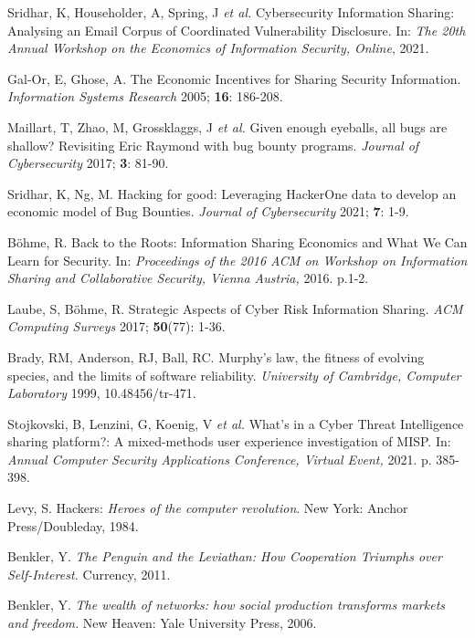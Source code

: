 \documentclass[unnumsec,webpdf,contemporary,large]{oup-authoring-template}%
\theoremstyle{thmstyleone}%
\theoremstyle{thmstyletwo}%
\theoremstyle{thmstylethree}%
\begin{document}
\begin{thebibliography}{10}

Sridhar, K, Householder, A, Spring, J {\em et al.}
  Cybersecurity Information Sharing: Analysing
an Email Corpus of Coordinated Vulnerability
Disclosure. In: {\em The 20th Annual Workshop on
the Economics of Information Security, Online}, 2021.

Gal-Or, E,  Ghose, A. The Economic Incentives for Sharing Security Information. 
{\em Information Systems Research} 2005; {\bf 16}: 186-208.

Maillart, T,  Zhao, M, Grossklaggs, J {\em et al.} Given enough eyeballs, all bugs are
shallow? Revisiting Eric Raymond with bug bounty programs. {\em Journal of Cybersecurity} 2017; {\bf 3}: 81-90.

Sridhar, K, Ng, M. Hacking for good: Leveraging HackerOne
data to develop an economic model of Bug Bounties. {\em Journal of Cybersecurity} 2021; {\bf 7}: 1-9.

B\"{o}hme, R. Back to the Roots: Information Sharing Economics and What We Can Learn for Security. In: {\em Proceedings of the 2016 ACM on Workshop on Information
Sharing and Collaborative Security, Vienna Austria,} 2016. p.1-2.

Laube, S, B\"{o}hme, R. Strategic Aspects of Cyber Risk Information Sharing. {\em ACM Computing Surveys} 2017; {\bf 50}(77): 1-36.

Brady, RM, Anderson, RJ, Ball, RC. Murphy’s law, the fitness of evolving species, and the limits of software reliability. {\em University of Cambridge, Computer Laboratory} 1999, 10.48456/tr-471.

Stojkovski, B, Lenzini, G, Koenig, V {\em et al.} What’s in a Cyber Threat Intelligence
sharing platform?: A mixed-methods user experience investigation of MISP. In: {\em Annual Computer Security Applications Conference, Virtual Event,} 2021. p. 385-398.

Levy, S. Hackers: {\em Heroes of the computer revolution}. New York: Anchor Press/Doubleday, 1984.

Benkler, Y. {\em The Penguin and the Leviathan: How Cooperation Triumphs over Self-Interest.} Currency, 2011.

Benkler, Y. {\em The wealth of networks: how social production transforms markets and
freedom.} New Heaven: Yale University Press, 2006.


\end{thebibliography}
\end{document}
